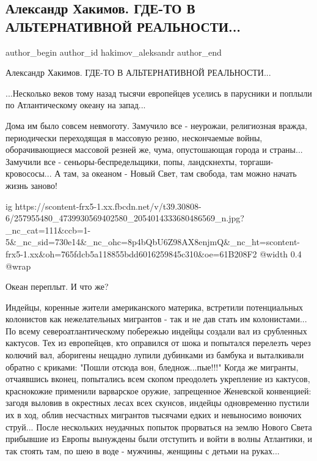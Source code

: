  
 
 
 
 
 
\subsection{Александр Хакимов. ГДЕ-ТО В АЛЬТЕРНАТИВНОЙ РЕАЛЬНОСТИ...}
\label{sec:16_11_2021.fb.hakimov_aleksandr.1.realnost_alternativnaja}
 
\ifcmt
 author_begin
   author_id hakimov_aleksandr
 author_end
\fi

Александр Хакимов. ГДЕ-ТО В АЛЬТЕРНАТИВНОЙ РЕАЛЬНОСТИ...

...Несколько веков тому назад тысячи европейцев уселись в парусники и поплыли
по Атлантическому океану на запад...

Дома им было совсем невмоготу. Замучило все - неурожаи, религиозная вражда,
периодически переходящая в массовую резню, нескончаемые войны, оборачивающиеся
массовой резней же, чума, опустошающая города и страны... Замучили все -
сеньоры-беспредельщики, попы, ландскнехты, торгаши-кровососы... А там, за
океаном - Новый Свет, там свобода, там можно начать жизнь заново!

\ifcmt
  ig https://scontent-frx5-1.xx.fbcdn.net/v/t39.30808-6/257955480_4739930569402580_2054014333680486569_n.jpg?_nc_cat=111&ccb=1-5&_nc_sid=730e14&_nc_ohc=8p4bQbU6Z98AX8enjmQ&_nc_ht=scontent-frx5-1.xx&oh=765fdcb5a118855bdd6016259845c310&oe=61B208F2
  @width 0.4
  @wrap 
\fi

Океан переплыт. И что же?

Индейцы, коренные жители американского материка, встретили потенциальных
колонистов как нежелательных мигрантов - так и не дав стать им колонистами...
По всему североатлантическому побережью индейцы создали вал из срубленных
кактусов. Тех из европейцев, кто оправился от шока и попытался перелезть через
колючий вал, аборигены нещадно лупили дубинками из бамбука и выталкивали
обратно с криками: "Пошли отсюда вон, бледнож...пые!!!" Когда же мигранты,
отчаявшись вконец, попытались всем скопом преодолеть укрепление из кактусов,
краснокожие применили варварское оружие, запрещенное Женевской конвенцией:
загодя выловив в окрестных лесах всех скунсов, индейцы одновременно пустили их
в ход, облив несчастных мигрантов тысячами едких и невыносимо вонючих струй...
После нескольких неудачных попыток прорваться на землю Нового Света прибывшие
из Европы вынуждены были отступить и войти в волны Атлантики, и так стоять там,
по шею в воде - мужчины, женщины с детьми на руках... 


